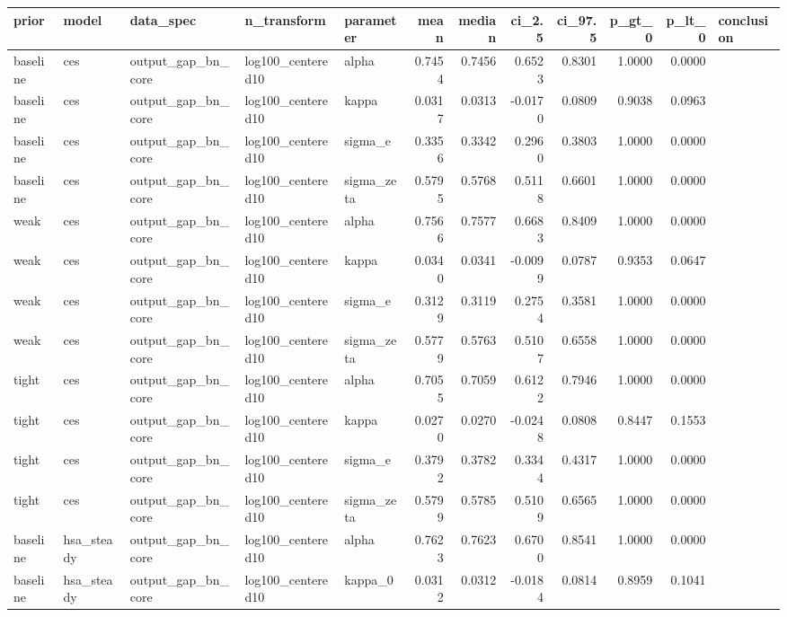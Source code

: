 \begin{tabular}{lllllrrrrrrl}
\toprule
prior & model & data\_spec & n\_transform & parameter & mean & median & ci\_2.5 & ci\_97.5 & p\_gt\_0 & p\_lt\_0 & conclusion \\
\midrule
baseline & ces & output\_gap\_bn\_core & log100\_centered10 & alpha & 0.7454 & 0.7456 & 0.6523 & 0.8301 & 1.0000 & 0.0000 &  \\
baseline & ces & output\_gap\_bn\_core & log100\_centered10 & kappa & 0.0317 & 0.0313 & -0.0170 & 0.0809 & 0.9038 & 0.0963 &  \\
baseline & ces & output\_gap\_bn\_core & log100\_centered10 & sigma\_e & 0.3356 & 0.3342 & 0.2960 & 0.3803 & 1.0000 & 0.0000 &  \\
baseline & ces & output\_gap\_bn\_core & log100\_centered10 & sigma\_zeta & 0.5795 & 0.5768 & 0.5118 & 0.6601 & 1.0000 & 0.0000 &  \\
weak & ces & output\_gap\_bn\_core & log100\_centered10 & alpha & 0.7566 & 0.7577 & 0.6683 & 0.8409 & 1.0000 & 0.0000 &  \\
weak & ces & output\_gap\_bn\_core & log100\_centered10 & kappa & 0.0340 & 0.0341 & -0.0099 & 0.0787 & 0.9353 & 0.0647 &  \\
weak & ces & output\_gap\_bn\_core & log100\_centered10 & sigma\_e & 0.3129 & 0.3119 & 0.2754 & 0.3581 & 1.0000 & 0.0000 &  \\
weak & ces & output\_gap\_bn\_core & log100\_centered10 & sigma\_zeta & 0.5779 & 0.5763 & 0.5107 & 0.6558 & 1.0000 & 0.0000 &  \\
tight & ces & output\_gap\_bn\_core & log100\_centered10 & alpha & 0.7055 & 0.7059 & 0.6122 & 0.7946 & 1.0000 & 0.0000 &  \\
tight & ces & output\_gap\_bn\_core & log100\_centered10 & kappa & 0.0270 & 0.0270 & -0.0248 & 0.0808 & 0.8447 & 0.1553 &  \\
tight & ces & output\_gap\_bn\_core & log100\_centered10 & sigma\_e & 0.3792 & 0.3782 & 0.3344 & 0.4317 & 1.0000 & 0.0000 &  \\
tight & ces & output\_gap\_bn\_core & log100\_centered10 & sigma\_zeta & 0.5799 & 0.5785 & 0.5109 & 0.6565 & 1.0000 & 0.0000 &  \\
baseline & hsa\_steady & output\_gap\_bn\_core & log100\_centered10 & alpha & 0.7623 & 0.7623 & 0.6700 & 0.8541 & 1.0000 & 0.0000 &  \\
baseline & hsa\_steady & output\_gap\_bn\_core & log100\_centered10 & kappa\_0 & 0.0312 & 0.0312 & -0.0184 & 0.0814 & 0.8959 & 0.1041 &  \\

\end{tabular}
